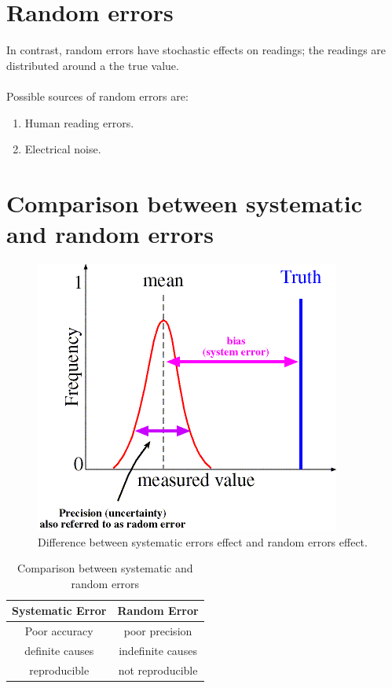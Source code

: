 \documentclass[a4paper,11pt]{book}
\begin{document}
\section*{Random errors}

In contrast, random errors have stochastic effects on readings; the readings are distributed around a the true value.  \\ \\  
Possible sources of random errors are:
\begin{enumerate}
\item Human reading errors.
\item Electrical noise.
\end{enumerate}

\section*{Comparison between systematic and random errors}
\begin{figure}[h!]\label{fig:uncertinity}
\centering
  \includegraphics[width=0.8\linewidth]{uncertinity}
  \caption{Difference between systematic errors effect and random errors effect.} 
\end{figure}

\begin{table}
\begin{tabular}{|c|c|}
\hline 
Systematic Error & Random Error \\ 
\hline 
Poor accuracy & poor precision \\ 
\hline 
definite causes & indefinite causes \\ 
\hline 
reproducible & not reproducible \\ 
\hline 
\end{tabular} 
\caption{Comparison between systematic and random errors}
\end{table}
\end{document}
